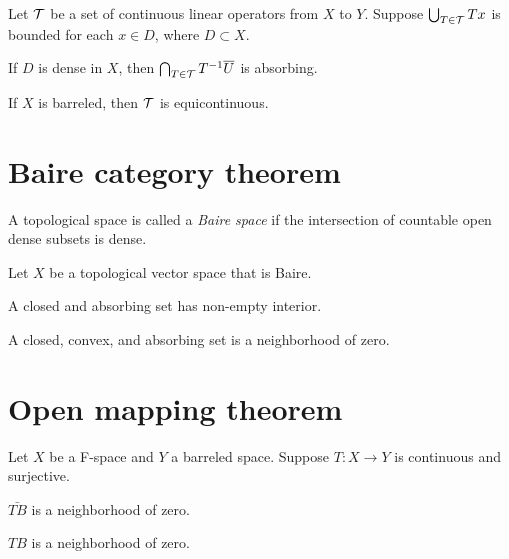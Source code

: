 \documentclass{../note}
\begin{document}

\begin{prb}
Let $\mathcal{T}$ be a set of continuous linear operators from $X$ to $Y$.
Suppose $\bigcup_{T\in\mathcal{T}}Tx$ is bounded for each $x\in D$, where $D\subset X$.
\begin{parts}
\item If $D$ is dense in $X$, then $\bigcap_{T\in\mathcal{T}}T^{-1}\overline U$ is absorbing.
\item If $X$ is barreled, then $\mathcal{T}$ is equicontinuous.
\end{parts}
\end{prb}



\section{Baire category theorem}

\begin{prb}
A topological space is called a \emph{Baire space} if the intersection of countable open dense subsets is dense.
\end{prb}


\begin{prb}
Let $X$ be a topological vector space that is Baire.
\begin{parts}
\item A closed and absorbing set has non-empty interior.
\item A closed, convex, and absorbing set is a neighborhood of zero.
\end{parts}
\end{prb}


\begin{prb}
\begin{parts}
\end{parts}
\end{prb}



\section{Open mapping theorem}

\begin{prb}
Let $X$ be a F-space and $Y$ a barreled space.
Suppose $T:X\to Y$ is continuous and surjective.
\begin{parts}
\item $\bar{TB}$ is a neighborhood of zero.
\item $TB$ is a neighborhood of zero.
\end{parts}
\end{prb}
\end{document}
